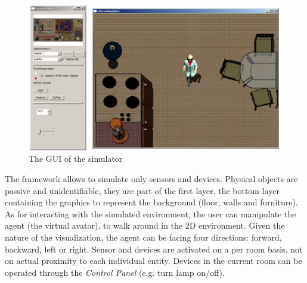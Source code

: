 \begin{figure}[H]
	\centering
	\includegraphics[width=\linewidth]{gfx/Chapter2/simulated_env}
	\caption{The GUI of the simulator}
	\label{fig:simulated_env}
\end{figure}

The framework allows to simulate only sensors and devices. Physical objects are passive and unidentifiable, they are part of the first layer, the bottom layer containing the graphics to represent the background (floor, walls and furniture).\\

As for interacting with the simulated environment, the user can manipulate the agent (the virtual avatar), to walk around in the 2D environment. Given the nature of the visualization, the agent can be facing four directions: forward, backward, left or right. Sensor and devices are activated on a per room basis, not on actual proximity to each individual entity. Devices in the current room can be operated through the \emph{Control Panel} (e.g. turn lamp on/off).\\
